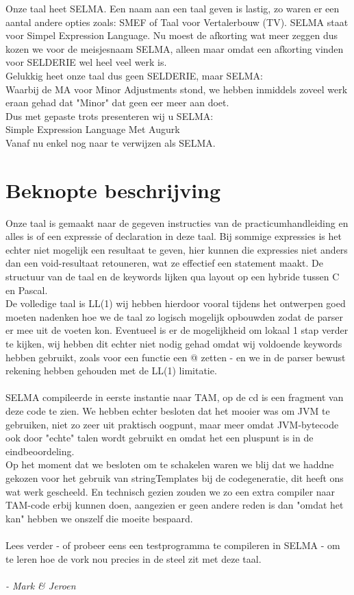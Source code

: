 \documentclass[]{article}
\begin{document}
Onze taal heet SELMA. Een naam aan een taal geven is lastig, zo waren er een aantal andere opties zoals: SMEF of Taal voor Vertalerbouw (TV).
SELMA staat voor Simpel Expression Language. Nu moest de afkorting wat meer zeggen dus kozen we voor de meisjesnaam SELMA, alleen maar omdat een afkorting vinden voor SELDERIE wel heel veel werk is.\\
Gelukkig heet onze taal dus geen SELDERIE, maar SELMA:\\
Waarbij de MA voor Minor Adjustments stond, we hebben inmiddels zoveel werk eraan gehad dat "Minor" dat geen eer meer aan doet. \\
Dus met gepaste trots presenteren wij u SELMA:\\
Simple Expression Language Met Augurk\\
Vanaf nu enkel nog naar te verwijzen als SELMA.\\

\newpage
\section{Beknopte beschrijving}
Onze taal is gemaakt naar de gegeven instructies van de practicumhandleiding en alles is of een expressie of declaration in deze taal. Bij sommige expressies is het echter niet mogelijk een resultaat te geven, hier kunnen die expressies niet anders dan een void-resultaat retouneren, wat ze effectief een statement maakt. De structuur van de taal en de keywords lijken qua layout op een hybride tussen C en Pascal. \\
De volledige taal is LL(1) wij hebben hierdoor vooral tijdens het ontwerpen goed moeten nadenken hoe we de taal zo logisch mogelijk opbouwden zodat de parser er mee uit de voeten kon. Eventueel is er de mogelijkheid om lokaal 1 stap verder te kijken, wij hebben dit echter niet nodig gehad omdat wij voldoende keywords hebben gebruikt, zoals voor een functie een @ zetten - en we in de parser bewust rekening hebben gehouden met de LL(1) limitatie.\\
\\
SELMA compileerde in eerste instantie naar TAM, op de cd is een fragment van deze code te zien. We hebben echter besloten dat het mooier was om JVM te gebruiken, niet zo zeer uit praktisch oogpunt, maar meer omdat JVM-bytecode ook door "echte" talen wordt gebruikt en omdat het een pluspunt is in de eindbeoordeling.\\
Op het moment dat we besloten om te schakelen waren we blij dat we haddne gekozen voor het gebruik van stringTemplates bij de codegeneratie, dit heeft ons wat werk gescheeld. En technisch gezien zouden we zo een extra compiler naar TAM-code erbij kunnen doen, aangezien er geen andere reden is dan "omdat het kan" hebben we onszelf die moeite bespaard.\\
\\
Lees verder - of probeer eens een testprogramma te compileren in SELMA - om te leren hoe de vork nou precies in de steel zit met deze taal.\\
\\
\textit{- Mark \& Jeroen}
\end{document}
